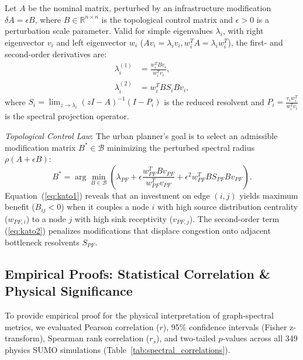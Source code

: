 \documentclass[lettersize,journal]{IEEEtran}
\begin{document}
Let $A$ be the nominal matrix, perturbed by an infrastructure modification $\delta A = \epsilon B$, where $B \in \mathbb{R}^{n \times n}$ is the topological control matrix and $\epsilon > 0$ is a perturbation scale parameter. Valid for simple eigenvalues $\lambda_i$, with right eigenvector $v_i$ and left eigenvector $w_i$ ($A v_i = \lambda_i v_i, w_i^T A = \lambda_i w_i^T$), the first- and second-order derivatives are:
\begin{align}
\lambda_i^{(1)} &= \frac{w_i^T B v_i}{w_i^T v_i}, \label{eq:kato1} \\
\lambda_i^{(2)} &= w_i^T B S_i B v_i, \label{eq:kato2}
\end{align}
where $S_i = \lim_{z \to \lambda_i} (zI - A)^{-1}(I - P_i)$ is the reduced resolvent and $P_i = \frac{v_i w_i^T}{w_i^T v_i}$ is the spectral projection operator.

\textit{Topological Control Law}: The urban planner's goal is to select an admissible modification matrix $B^* \in \mathcal{B}$ minimizing the perturbed spectral radius $\rho(A + \epsilon B)$:
\begin{equation}
B^* = \arg\min_{B \in \mathcal{B}} \left( \lambda_{PF} + \epsilon \frac{w_{PF}^T B v_{PF}}{w_{PF}^T v_{PF}} + \epsilon^2 w_{PF}^T B S_{PF} B v_{PF} \right).
\end{equation}
Equation~(\ref{eq:kato1}) reveals that an investment on edge $(i, j)$ yields maximum benefit ($B_{ij} < 0$) when it couples a node $i$ with high source distribution centrality ($w_{PF, i}$) to a node $j$ with high sink receptivity ($v_{PF, j}$). The second-order term (\ref{eq:kato2}) penalizes modifications that displace congestion onto adjacent bottleneck resolvents $S_{PF}$.

\subsection{Empirical Proofs: Statistical Correlation \& Physical Significance}
To provide empirical proof for the physical interpretation of graph-spectral metrics, we evaluated Pearson correlation ($r$), 95\% confidence intervals (Fisher z-transform), Spearman rank correlation ($r_s$), and two-tailed $p$-values across all 349 physics SUMO simulations (Table~\ref{tab:spectral_correlations}).
\end{document}
